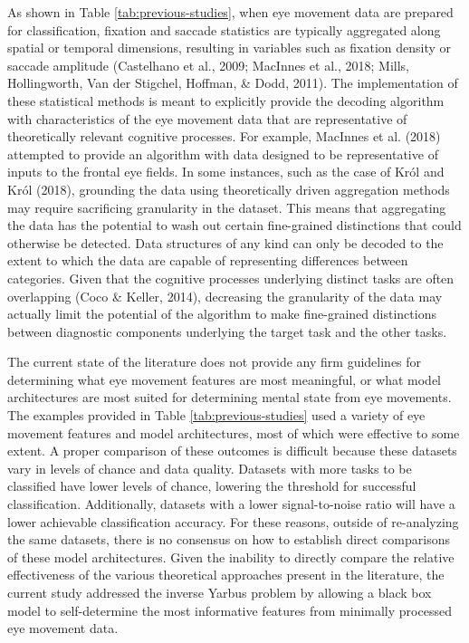 \documentclass[
  english,
  man,floatsintext]{apa6}
\begin{document}
As shown in Table \ref{tab:previous-studies}, when eye movement data are prepared for classification, fixation and saccade statistics are typically aggregated along spatial or temporal dimensions, resulting in variables such as fixation density or saccade amplitude (Castelhano et al., 2009; MacInnes et al., 2018; Mills, Hollingworth, Van der Stigchel, Hoffman, \& Dodd, 2011). The implementation of these statistical methods is meant to explicitly provide the decoding algorithm with characteristics of the eye movement data that are representative of theoretically relevant cognitive processes. For example, MacInnes et al. (2018) attempted to provide an algorithm with data designed to be representative of inputs to the frontal eye fields. In some instances, such as the case of Król and Król (2018), grounding the data using theoretically driven aggregation methods may require sacrificing granularity in the dataset. This means that aggregating the data has the potential to wash out certain fine-grained distinctions that could otherwise be detected. Data structures of any kind can only be decoded to the extent to which the data are capable of representing differences between categories. Given that the cognitive processes underlying distinct tasks are often overlapping (Coco \& Keller, 2014), decreasing the granularity of the data may actually limit the potential of the algorithm to make fine-grained distinctions between diagnostic components underlying the target task and the other tasks.

The current state of the literature does not provide any firm guidelines for determining what eye movement features are most meaningful, or what model architectures are most suited for determining mental state from eye movements. The examples provided in Table \ref{tab:previous-studies} used a variety of eye movement features and model architectures, most of which were effective to some extent. A proper comparison of these outcomes is difficult because these datasets vary in levels of chance and data quality. Datasets with more tasks to be classified have lower levels of chance, lowering the threshold for successful classification. Additionally, datasets with a lower signal-to-noise ratio will have a lower achievable classification accuracy. For these reasons, outside of re-analyzing the same datasets, there is no consensus on how to establish direct comparisons of these model architectures. Given the inability to directly compare the relative effectiveness of the various theoretical approaches present in the literature, the current study addressed the inverse Yarbus problem by allowing a black box model to self-determine the most informative features from minimally processed eye movement data.
\end{document}
